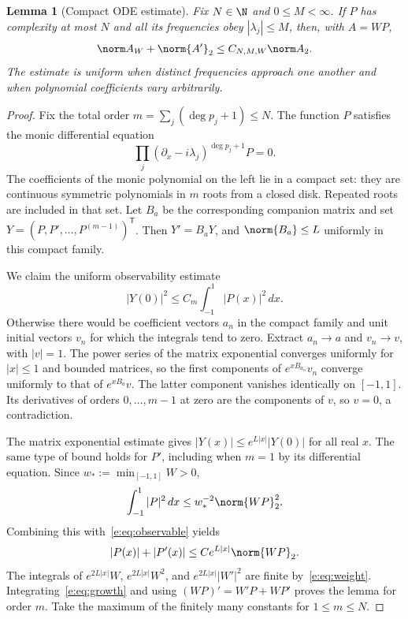 \documentclass[11pt,a4paper]{article}
\numberwithin{equation}{section}
\newtheorem{lemma}[theorem]{Lemma}
\theoremstyle{definition}\newtheorem{definition}[theorem]{Definition}
\theoremstyle{remark}\newtheorem{remark}[theorem]{Remark}
\begin{document}
\begin{lemma}[Compact ODE estimate]\label{e:lem:ode}
Fix $N\in\N$ and $0\le M<\infty$. If $P$ has complexity at most $N$ and all
its frequencies obey $|\lambda_j|\le M$, then, with $A=WP$,
\begin{equation}\label{e:eq:envelope}
 \norm A_W+\norm{A'}_2\le C_{N,M,W}\norm A_2.
\end{equation}
The estimate is uniform when distinct frequencies approach one another
and when polynomial coefficients vary arbitrarily.
\end{lemma}
\begin{proof}
Fix the total order $m=\sum_j(\deg p_j+1)\le N$. The function $P$
satisfies the monic differential equation
\begin{equation}\label{e:eq:annihilator}
 \prod_j(\partial_x-i\lambda_j)^{\deg p_j+1}P=0.
\end{equation}
The coefficients of the monic polynomial on the left lie in a compact set:
they are continuous symmetric polynomials in $m$ roots from a closed disk.
Repeated roots are included in that set. Let $B_a$ be the corresponding
companion matrix and set $Y=(P,P',\ldots,P^{(m-1)})^{\mathsf T}$. Then
$Y'=B_aY$, and $\norm{B_a}\le L$ uniformly in this compact family.

We claim the uniform observability estimate
\begin{equation}\label{e:eq:observable}
 |Y(0)|^2\le C_m\int_{-1}^1|P(x)|^2\,dx.
\end{equation}
Otherwise there would be coefficient vectors $a_n$ in the compact family
and unit initial vectors $v_n$ for which the integrals tend to zero.
Extract $a_n\to a$ and $v_n\to v$, with $|v|=1$. The power series of the
matrix exponential converges uniformly for $|x|\le1$ and bounded matrices,
so the first components of $e^{xB_{a_n}}v_n$ converge uniformly to that of
$e^{xB_a}v$. The latter component vanishes identically on $[-1,1]$.
Its derivatives of orders $0,\ldots,m-1$ at zero are the components of $v$,
so $v=0$, a contradiction.

The matrix exponential estimate gives
$|Y(x)|\le e^{L|x|}|Y(0)|$ for all real $x$. The same type of bound holds
for $P'$, including when $m=1$ by its differential equation. Since
$w_*:=\min_{[-1,1]}W>0$,
\[
 \int_{-1}^1|P|^2\,dx\le w_*^{-2}\norm{WP}_2^2.
\]
Combining this with~\eqref{e:eq:observable} yields
\begin{equation}\label{e:eq:growth}
 |P(x)|+|P'(x)|\le C e^{L|x|}\norm{WP}_2.
\end{equation}
The integrals of $e^{2L|x|}W$, $e^{2L|x|}W^2$, and
$e^{2L|x|}|W'|^2$ are finite by~\eqref{e:eq:weight}.
Integrating~\eqref{e:eq:growth} and using $(WP)'=W'P+WP'$ proves the lemma
for order $m$. Take the maximum of the finitely many constants for
$1\le m\le N$.
\end{proof}
\end{document}
